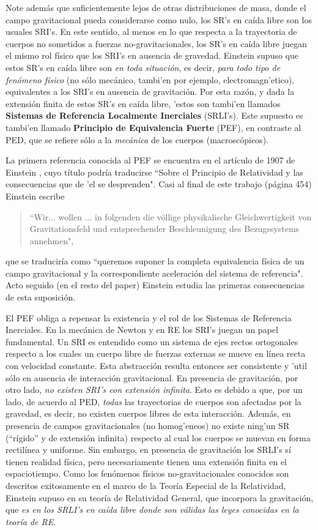 Note además que suficientemente lejos de otras distribuciones de masa, donde el campo gravitacional pueda considerarse como nulo, los SR's en caída libre son los usuales SRI's. En este sentido, al menos en lo que respecta a la trayectoria de cuerpos no sometidos a fuerzas no-gravitacionales, los SR's en caída libre juegan el mismo rol físico que los SRI's en ausencia de gravedad. Einstein supuso que estos SR's en caída libre son \textit{en toda situación}, es decir, \textit{para todo tipo de fenómeno físico} (no sólo mecánico, tambi'en por ejemplo, electromagn'etico), equivalentes a los SRI's en ausencia de gravitación. Por esta razón, y dada la extensión finita de estos SR's en caída libre, 'estos son tambi'en llamados \textbf{Sistemas de Referencia Localmente Inerciales} (SRLI's). Este supuesto es tambi'en llamado \textbf{Principio de Equivalencia Fuerte} (PEF), en contraste al PED, que se refiere sólo a la \emph{mecánica} de los cuerpos (macroscópicos).

La primera referencia conocida al PEF se encuentra en el artículo de 1907 de Einstein \cite{Einstein07}, cuyo título podría traducirse ``Sobre el Principio de Relatividad y las consecuencias que de 'el se desprenden".
 Casi al final de este trabajo (página 454) Einstein escribe 
\begin{quotation}
``Wir... wollen ... in folgenden die v\"ollige physikalische Gleichwertigkeit von Gravitationsfeld und entsprechender Beschleunigung des Bezugssystems annehmen",
\end{quotation}
que se traduciría como ``queremos suponer la completa equivalencia física de un campo gravitacional y la correspondiente aceleración del sistema de referencia". Acto seguido (en el resto del paper) Einstein estudia las primeras consecuencias de esta suposición.
 
El PEF obliga a repensar la existencia y el rol de los Sistemas de Referencia Inerciales. En la mecánica de Newton y en RE los SRI's juegan un papel fundamental. Un SRI es entendido como un sistema de ejes rectos ortogonales respecto a los cuales un cuerpo libre de fuerzas externas se mueve en línea recta con velocidad constante. Esta abstracción resulta entonces ser consistente y 'util sólo en ausencia de interacción gravitacional. En presencia de gravitación, por otro lado, \textit{no existen SRI's con extensión infinita}. Esto es debido a que, por un lado, de acuerdo al PED, \textit{todas} las trayectorias de cuerpos son afectadas por la gravedad, es decir, no existen cuerpos libres de esta interacción. Además, en presencia de campos gravitacionales (no homog'eneos) no existe ning'un SR (``rígido'' y de extensión infinita) respecto al cual los cuerpos se muevan en forma rectilínea y uniforme.
Sin embargo, en presencia de gravitación los SRLI's sí tienen realidad física, pero necesariamente tienen una extensión finita en el espaciotiempo.
Como los fenómenos físicos no-gravitacionales conocidos son descritos exitosamente en el marco de la Teoría Especial de la Relatividad, Einstein supuso en su teoría de Relatividad General, que incorpora la gravitación, que \textit{es en los SRLI's en caída libre donde son válidas las leyes conocidas en la teoría de RE}.

